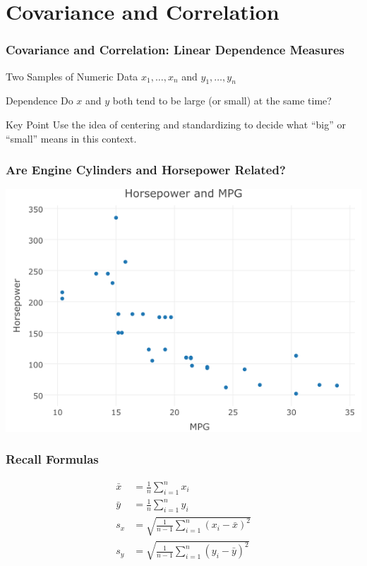 \documentclass{beamer}
\begin{document}
\section{Covariance and Correlation}
\begin{frame}
\frametitle{Covariance and Correlation: Linear Dependence Measures}
	\begin{block}{Two Samples of Numeric Data}
		$x_1, \hdots, x_n$ and $y_1, \hdots, y_n$
	\end{block}
	\begin{block}{Dependence}
		Do $x$ and $y$ both tend to be large (or small) at the same time?
	\end{block}
	\begin{block}{Key Point}
		Use the idea of centering and standardizing to decide what ``big'' or ``small'' means in this 			context.
	\end{block}
\end{frame}

\begin{frame}
\frametitle{Are Engine Cylinders and Horsepower Related?}
	\includegraphics[scale=0.5]{./images/cars.png}
\end{frame}

\begin{frame}
\frametitle{Recall Formulas}
	\begin{align*}
		\bar{x} &= \frac{1}{n} \sum_{i = 1}^n x_i
		\\
		\bar{y} &= \frac{1}{n} \sum_{i = 1}^n y_i
		\\
		s_x &= \sqrt{\frac{1}{n - 1} \sum_{i = 1}^n (x_i - \bar{x})^2}
		\\
		s_y &= \sqrt{\frac{1}{n - 1} \sum_{i = 1}^n (y_i - \bar{y})^2}
	\end{align*}
\end{frame}
\end{document}
